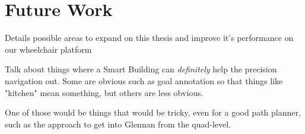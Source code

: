 \section{Future Work}\label{sec:future_work}

Details possible areas to expand on this thesis and improve it's performance on our wheelchair platform

Talk about things where a Smart Building can \emph{definitely} help the precision navigation out. Some are obvious such as goal annotation so that things like "kitchen" mean something, but others are less obvious.

One of those would be things that would be tricky, even for a good path planner, such as the approach to get into Glennan from the quad-level.